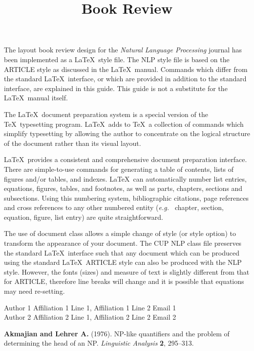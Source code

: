 \documentclass[bookreview]{CUP-JNL-NLP}
\begin{document}
\label{firstpage}


\jnlPage{\pageref{firstpage}}{\pageref{lastpage}}

\title{Book Review}

\maketitle


The layout book review design for the {\em Natural Language Processing} journal
has been implemented as a \LaTeX\ style file. The NLP style file is based
on the ARTICLE style as discussed in the \LaTeX\ manual. Commands which
differ from the standard \LaTeX\ interface, or which are provided in addition
to the standard interface, are explained in this guide. This guide is not a
substitute for the \LaTeX\ manual itself.

The \LaTeX\ document preparation system is a special version of the
\TeX\ typesetting program. \LaTeX\ adds to \TeX\ a collection of
commands which simplify typesetting by allowing the author to
concentrate on the logical structure of the document rather than
its visual layout.

\LaTeX\ provides a consistent and comprehensive document preparation
interface. There are simple-to-use commands for generating a table of
contents, lists of figures and/or tables, and indexes. \LaTeX\ can
automatically number list entries, equations, figures, tables, and
footnotes, as well as parts, chapters, sections and subsections.
Using this numbering system, bibliographic citations, page references
and cross references to any other numbered entity ({\it e.g.\ } chapter,
section, equation, figure, list entry) are quite straightforward.

The use of document class allows a simple change of style (or style option)
to transform the appearance of your document. The CUP NLP class file preserves
the standard \LaTeX\ interface such that any document which can be produced
using the standard \LaTeX\ ARTICLE style can also be produced with the
NLP style. However, the fonts (sizes) and measure of text is slightly different
from that for ARTICLE, therefore line breaks will change and it is possible
that equations may need re-setting.

\begin{contrib}
Author 1
Affiliation 1 Line 1,
Affiliation 1 Line 2
Email 1\\
Author 2
Affiliation 2 Line 1,
Affiliation 2 Line 2
Email 2
\end{contrib}

\begin{thebibliography}{}
   \textbf{Akmajian and Lehrer A.} (1976). NP-like quantifiers and the
   problem of determining the head of an NP. {\it Linguistic
   Analysis\/} \textbf{2}, 295--313.
\end{thebibliography}

\label{lastpage}
\end{document}
